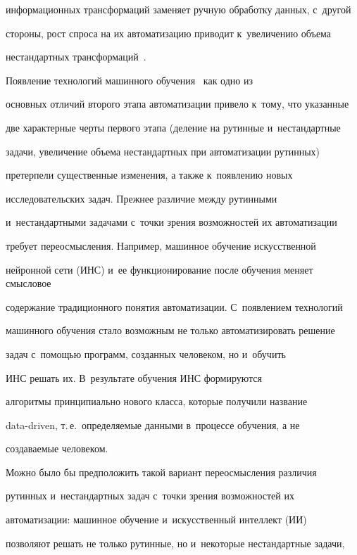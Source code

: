 информационных трансформаций заменяет ручную обработку данных, с~другой 


стороны, рост спроса на их автоматизацию приводит к~увеличению объема 


нестандартных трансформаций~\cite{2-eg}.


  


  Появление технологий машинного обучения~\cite{4-eg, 5-eg} как одно из 


основных отличий второго этапа автоматизации привело к~тому, что указанные 


две характерные черты первого этапа (деление на рутинные и~нестандартные 


задачи, увеличение объема нестандартных при автоматизации рутинных) 


претерпели существенные изменения, а также к~появлению новых 


исследовательских задач. Прежнее различие между рутинными 


и~нестандартными задачами с~точки зрения возможностей их автоматизации 


требует переосмысления. Например, машинное обучение искусственной 


нейронной сети (ИНС) и~ее функционирование после обучения меняет смысловое 


содержание традиционного понятия автоматизации. С~появлением технологий 


машинного обучения стало возможным не только автоматизировать решение 


задач с~помощью программ, созданных человеком, но и~обучить 


ИНС решать их. В~результате обучения ИНС формируются 


алгоритмы принципиально нового класса, которые получили название  


data-driven, т.\,е.\ определяемые данными в~процессе обучения, а не 


создаваемые человеком.


  


  Можно было бы предположить такой вариант переосмысления различия 


рутинных и~нестандартных задач с~точки зрения возможностей их 


автоматизации: машинное обучение и~искусственный интеллект (ИИ) 


позволяют решать не только рутинные, но и~некоторые нестандартные задачи, 



